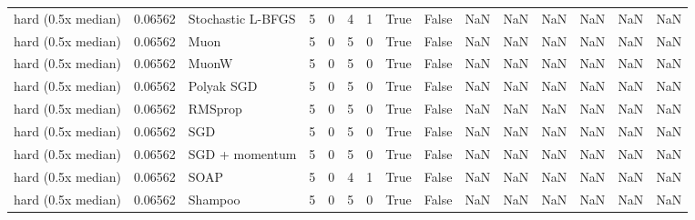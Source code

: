 \begin{tabular}{lrlrrrrrrrrrrrr}
hard (0.5x median) & 0.06562 & Stochastic L-BFGS & 5 & 0 & 4 & 1 & True & False & NaN & NaN & NaN & NaN & NaN & NaN \\
hard (0.5x median) & 0.06562 & Muon & 5 & 0 & 5 & 0 & True & False & NaN & NaN & NaN & NaN & NaN & NaN \\
hard (0.5x median) & 0.06562 & MuonW & 5 & 0 & 5 & 0 & True & False & NaN & NaN & NaN & NaN & NaN & NaN \\
hard (0.5x median) & 0.06562 & Polyak SGD & 5 & 0 & 5 & 0 & True & False & NaN & NaN & NaN & NaN & NaN & NaN \\
hard (0.5x median) & 0.06562 & RMSprop & 5 & 0 & 5 & 0 & True & False & NaN & NaN & NaN & NaN & NaN & NaN \\
hard (0.5x median) & 0.06562 & SGD & 5 & 0 & 5 & 0 & True & False & NaN & NaN & NaN & NaN & NaN & NaN \\
hard (0.5x median) & 0.06562 & SGD + momentum & 5 & 0 & 5 & 0 & True & False & NaN & NaN & NaN & NaN & NaN & NaN \\
hard (0.5x median) & 0.06562 & SOAP & 5 & 0 & 4 & 1 & True & False & NaN & NaN & NaN & NaN & NaN & NaN \\
hard (0.5x median) & 0.06562 & Shampoo & 5 & 0 & 5 & 0 & True & False & NaN & NaN & NaN & NaN & NaN & NaN \\
\bottomrule
\end{tabular}
